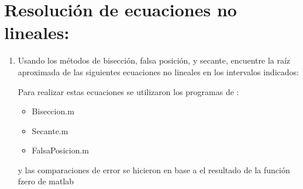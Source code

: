 \documentclass{udpreport}
\begin{document}
\chapter{Resolución de ecuaciones no lineales:}
\begin{enumerate}
\item Usando los métodos de bisección, falsa posición, y secante, encuentre la raíz aproximada 
de las siguientes ecuaciones no lineales en los intervalos indicados:

    \begin{enumerate}
        
    Para realizar estas ecuaciones se utilizaron los programas de :
    \begin{itemize}
        \item Biseccion.m
        \item Secante.m
        \item FalsaPosicion.m
    \end{itemize}
    y las comparaciones de error se hicieron en base a el resultado de la función fzero de matlab
    

\end{enumerate}
\end{enumerate}
\end{document}
